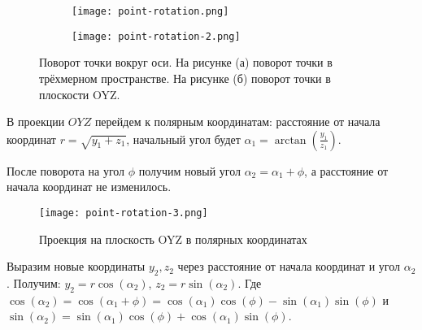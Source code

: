 \begin{figure}[ht]
    \centering
    \hspace*{\fill}%
    \begin{subfigure}[b]{0.49\textwidth}
        \texttt{[image: point-rotation.png]}
        \caption{}
        \label{fig:point-rot-1}
    \end{subfigure}
    \begin{subfigure}[b]{0.49\textwidth}
        \texttt{[image: point-rotation-2.png]}
        \caption{}
        \label{fig:point-rot-2}
    \end{subfigure}
    \caption{Поворот точки вокруг оси. На рисунке (а) поворот точки в трёхмерном пространстве.
    На рисунке (б) поворот точки в плоскости OYZ.}
    \label{fig:point-rot}
\end{figure}

В проекции \(OYZ\) перейдем к полярным координатам: расстояние от начала координат \(r=\sqrt{y_1+z_1}\), начальный угол будет
 \(\alpha_1=\arctan(\frac{y_1}{z_1})\).

После поворота на угол \(\phi\) получим новый угол \(\alpha_2=\alpha_1+\phi\), а расстояние от начала координат не изменилось.

\begin{figure}[ht]
    \centering
    \texttt{[image: point-rotation-3.png]}
    \caption{Проекция на плоскость OYZ в полярных координатах}
    \label{fig:point-rot-3}
\end{figure}

\newpage

Выразим новые координаты \(y_2, z_2\) через расстояние от начала координат и угол \(\alpha_2\).
Получим: \(y_2=r\cos(\alpha_2)\), \(z_2=r\sin(\alpha_2)\). Где \(\cos(\alpha_2)=\cos(\alpha_1+\phi)=\cos(\alpha_1)\cos(\phi)-\sin(\alpha_1)\sin(\phi)\) и \(\sin(\alpha_2)=\sin(\alpha_1)\cos(\phi)+\cos(\alpha_1)\sin(\phi)\).

